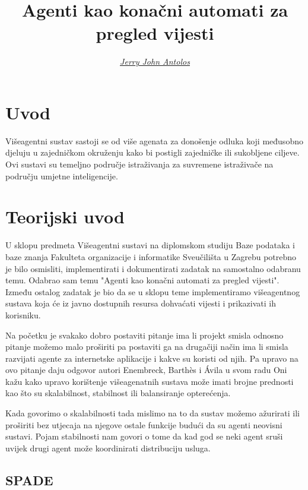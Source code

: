 \documentclass[]{foi} %
\title{Agenti kao konačni automati za pregled vijesti}
\author{{\href{https://github.com/jantolos/MASproject_2022}{\textit{\underline{Jerry John Antolos}}}}} %
\begin{document}
\maketitle

\tableofcontents

\makeatletter {} \makeatother
\pagestyle{plain}



\chapter{Uvod}
Višeagentni sustav sastoji se od više agenata za donošenje odluka koji međusobno djeluju u zajedničkom okruženju kako bi postigli zajedničke ili sukobljene ciljeve. Ovi sustavi su temeljno područje istraživanja za suvremene istraživače na području umjetne inteligencije.\cite{noauthor_multi-agent_nodate}
\chapter{Teorijski uvod}
U sklopu predmeta Višeagentni sustavi na diplomskom studiju Baze podataka i baze znanja Fakulteta organizacije i informatike Sveučilišta u Zagrebu potrebno je bilo osmisliti, implementirati i dokumentirati zadatak na samostalno odabranu temu. Odabrao sam temu "Agenti kao konačni automati za pregled vijesti". Između ostalog zadatak je bio da se u sklopu teme implementiramo višeagentnog sustava koja će iz javno dostupnih resursa dohvaćati vijesti i prikazivati ih korisniku.

Na početku je svakako dobro postaviti pitanje ima li projekt smisla odnosno pitanje možemo malo proširiti pa postaviti ga na drugačiji način ima li smisla razvijati agente za internetske aplikacije i kakve su koristi od njih. Pa upravo na ovo pitanje daju odgovor autori Enembreck, Barthès i Ávila u svom radu \cite{10.1007/978-3-540-30104-2_7} Oni kažu kako upravo korištenje višeagenatnih sustava može imati brojne prednosti kao što su skalabilnost, stabilnost ili balansiranje opterećenja.

Kada govorimo o skalabilnosti tada mislimo na to da sustav možemo ažurirati ili proširiti bez utjecaja na njegove ostale funkcije budući da su agenti neovisni sustavi. Pojam stabilnosti nam govori o tome da kad god se neki agent sruši uvijek drugi agent može koordinirati distribuciju usluga.

\section{SPADE}
\end{document}
